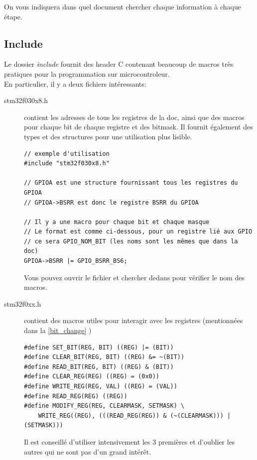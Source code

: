 \documentclass[a4paper,10pt]{article} %
\begin{document}
On vous indiquera dans quel document chercher chaque information à chaque étape.

\subsection{Include}
Le dossier \textit{include} fournit des header C contenant beaucoup de macros très pratiques pour la programmation sur microcontroleur.\\

En particulier, il y a deux fichiers intéressants:
\begin{description}
    \item[stm32f030x8.h] contient les adresses de tous les registres de la doc, ainsi que des macros pour chaque bit de chaque registre et des bitmask. Il fournit également des types et des structures pour une utilisation plus lisible.

\begin{lstlisting}[frame=single]
// exemple d'utilisation
#include "stm32f030x8.h"

// GPIOA est une structure fournissant tous les registres du GPIOA
// GPIOA->BSRR est donc le registre BSRR du GPIOA

// Il y a une macro pour chaque bit et chaque masque
// Le format est comme ci-dessous, pour un registre lié aux GPIO
// ce sera GPIO_NOM_BIT (les noms sont les mêmes que dans la doc)
GPIOA->BSRR |= GPIO_BSRR_BS6;
\end{lstlisting}

Vous pouvez ouvrir le fichier et chercher dedans pour vérifier le nom des macros.

\item[stm32f0xx.h] contient des macros utiles pour interagir avec les registres (mentionnées dans la \autoref{bit_change} )

\begin{lstlisting}[frame=single]
#define SET_BIT(REG, BIT) ((REG) |= (BIT))
#define CLEAR_BIT(REG, BIT) ((REG) &= ~(BIT))
#define READ_BIT(REG, BIT) ((REG) & (BIT))
#define CLEAR_REG(REG) ((REG) = (0x0))
#define WRITE_REG(REG, VAL) ((REG) = (VAL))
#define READ_REG(REG) ((REG))
#define MODIFY_REG(REG, CLEARMASK, SETMASK) \
    WRITE_REG((REG), (((READ_REG(REG)) & (~(CLEARMASK))) | (SETMASK)))
\end{lstlisting}

Il est conseillé d'utiliser intensivement les 3 premières et d'oublier les autres qui ne sont pas d'un grand intérêt.\\


\end{description}
\end{document}
